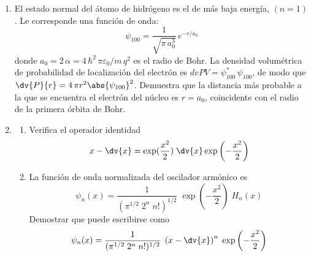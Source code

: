 \begin{enumerate}
\item El estado normal del átomo de hidrógeno es el de más baja energía, $(n = 1)$. Le corresponde una función de onda:
\[ \psi_{100} = \dfrac{1}{\sqrt{\pi \, a_{0}^{3}}} \, e^{-r/a_{0}}\]
donde $a_{0} = 2 \, \alpha = 4 \, \hbar^{2} \, \pi \varepsilon_{0}/ m \,q^{2}$ es el radio de Bohr. La densidad volumétrica de probabilidad de localización del electrón es $dv{P}{V} = \psi_{100}^{*} \, \psi_{100}$, de modo que $\dv{P}{r} = 4 \, \pi r^{2} \abs{\psi_{100}}^{2}$. Demuestra que la distancia más probable a la que se encuentra el electrón del núcleo es $r = a_{0}$, coincidente con el radio de la primera órbita de Bohr.
\item \begin{enumerate}[label=\alph{*})]
\item Verifica el operador identidad
\[ x - \dv{x} = \exp(\dfrac{x^{2}}{2}) \; \dv{x} \exp \left(- \dfrac{x^{2}}{2} \right) \]
\item La función de onda normalizada del oscilador armónico es
\[ \psi_{n} (x) = \dfrac{1}{(\pi^{1/2} \; 2^{n} \; n!)^{1/2}} \; \exp \left(- \dfrac{x^{2}}{2} \right) \; H_{n}(x) \]
Demostrar que puede escribirse como
\[ \psi_{n} (x) = \dfrac{1}{(\pi^{1/2} \; 2^{n} \; n!)^{1/2}} \; \left( x - \dv{x} \right)^{n} \; \exp \left(- \dfrac{x^{2}}{2} \right) \]
\end{enumerate}

\end{enumerate}
